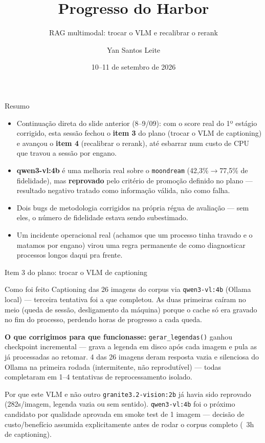 \documentclass{beamer}
\title{Progresso do Harbor}
\subtitle{RAG multimodal: trocar o VLM e recalibrar o rerank}
\author{Yan Santos Leite}
\date{10--11 de setembro de 2026}
\newenvironment{numerobloco}[1]{\begin{block}{#1}}{\end{block}}
\newenvironment{decisaobloco}[1]{\begin{alertblock}{#1}}{\end{alertblock}}
\begin{document}
\frame{\titlepage}

\begin{frame}{Resumo}
  \begin{itemize}
    \item Continuação direta do slide anterior (8--9/09): com o score real do 1º
      estágio corrigido, esta sessão fechou o \textbf{item 3} do plano (trocar o VLM
      de captioning) e avançou o \textbf{item 4} (recalibrar o rerank), até esbarrar
      num custo de CPU que travou a sessão por engano.
    \item \textbf{qwen3-vl:4b} é uma melhoria real sobre o \texttt{moondream}
      (42,3\%$\to$77,5\% de fidelidade), mas \textbf{reprovado} pelo critério de
      promoção definido no plano — resultado negativo tratado como informação válida,
      não como falha.
    \item Dois bugs de metodologia corrigidos na própria régua de avaliação — sem eles,
      o número de fidelidade estava sendo subestimado.
    \item Um incidente operacional real (achamos que um processo tinha travado e o
      matamos por engano) virou uma regra permanente de como diagnosticar processos
      longos daqui pra frente.
  \end{itemize}
\end{frame}

\begin{frame}{Item 3 do plano: trocar o VLM de captioning}
  \small
  \begin{numerobloco}{Como foi feito}
    Captioning das 26 imagens do corpus via \texttt{qwen3-vl:4b} (Ollama local) —
    terceira tentativa foi a que completou. As duas primeiras caíram no meio (queda de
    sessão, desligamento da máquina) porque o cache só era gravado no fim do processo,
    perdendo horas de progresso a cada queda.
  \end{numerobloco}

  \pause
  \textbf{O que corrigimos para que funcionasse:} \texttt{gerar\_legendas()} ganhou
  checkpoint incremental — grava a legenda em disco após cada imagem e pula as já
  processadas ao retomar. 4 das 26 imagens deram resposta vazia e silenciosa do Ollama
  na primeira rodada (intermitente, não reprodutível) — todas completaram em 1--4
  tentativas de reprocessamento isolado.

  \pause
  \begin{decisaobloco}{Por que este VLM e não outro}
    \texttt{granite3.2-vision:2b} já havia sido reprovado (282s/imagem, legenda vazia
    ou sem sentido). \texttt{qwen3-vl:4b} foi o próximo candidato por qualidade
    aprovada em smoke test de 1 imagem — decisão de custo/benefício assumida
    explicitamente antes de rodar o corpus completo (~3h de captioning).
  \end{decisaobloco}
\end{frame}
\end{document}

